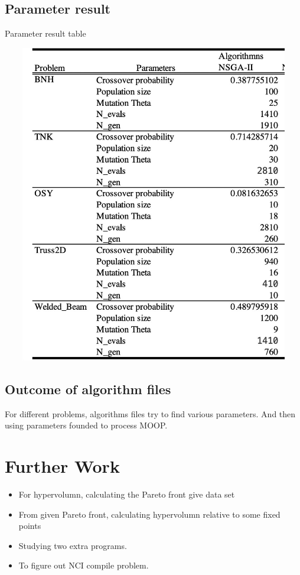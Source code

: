 \documentclass{article}
\begin{document}
\subsection{Parameter result}
\begin{table}[htpb]
\caption{Parameter result table}
\begin{center}
\includegraphics[width=6in, height = 14cm]{parameter_result.jpg}
\end{center}
\end{table}

\subsection{Outcome of algorithm files}
For different problems, algorithms files try to find various parameters. And then using parameters founded to process MOOP.

\section{Further Work}

\begin{itemize}
    \item For hypervolumn, calculating the Pareto front give data set
    \item From given Pareto front, calculating hypervolumn relative to some fixed points
    \item Studying two extra programs.
    \item To figure out NCI compile problem. 
\end{itemize} 
\end{document}
